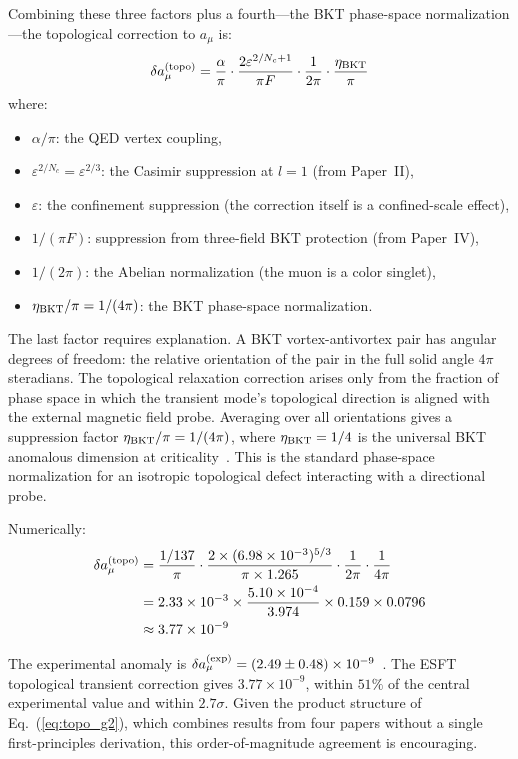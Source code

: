 ﻿\documentclass[twocolumn,preprintnumbers,amsmath,amssymb]{revtex4-2}
\begin{document}
Combining these three factors plus a fourth---the BKT phase-space normalization---the topological correction to $a_\mu$ is:
\begin{equation}
\delta a_\mu^{(\rm topo)} = \frac{\alpha}{\pi} \cdot \frac{2\varepsilon^{2/N_c + 1}}{\pi F} \cdot \frac{1}{2\pi} \cdot \frac{\eta_{\rm BKT}}{\pi}
\label{eq:topo_g2}
\end{equation}
where:
\begin{itemize}
\item $\alpha/\pi$: the QED vertex coupling,
\item $\varepsilon^{2/N_c} = \varepsilon^{2/3}$: the Casimir suppression at $l = 1$ (from Paper~II),
\item $\varepsilon$: the confinement suppression (the correction itself is a confined-scale effect),
\item $1/(\pi F)$: suppression from three-field BKT protection (from Paper~IV),
\item $1/(2\pi)$: the Abelian normalization (the muon is a color singlet),
\item $\eta_{\rm BKT}/\pi = 1/(4\pi)$: the BKT phase-space normalization.
\end{itemize}

The last factor requires explanation. A BKT vortex-antivortex pair has angular degrees of freedom: the relative orientation of the pair in the full solid angle $4\pi$ steradians. The topological relaxation correction arises only from the fraction of phase space in which the transient mode's topological direction is aligned with the external magnetic field probe. Averaging over all orientations gives a suppression factor $\eta_{\rm BKT}/\pi = 1/(4\pi)$, where $\eta_{\rm BKT} = 1/4$ is the universal BKT anomalous dimension at criticality~\cite{NK1977}. This is the standard phase-space normalization for an isotropic topological defect interacting with a directional probe.

Numerically:
\begin{align}
\delta a_\mu^{(\rm topo)} &= \frac{1/137}{\pi} \cdot \frac{2 \times (6.98 \times 10^{-3})^{5/3}}{\pi \times 1.265} \cdot \frac{1}{2\pi} \cdot \frac{1}{4\pi} \notag \\
&= 2.33 \times 10^{-3} \times \frac{5.10 \times 10^{-4}}{3.974} \times 0.159 \times 0.0796 \notag \\
&\approx 3.77 \times 10^{-9}
\label{eq:topo_g2_num}
\end{align}

The experimental anomaly is $\delta a_\mu^{(\rm exp)} = (2.49 \pm 0.48) \times 10^{-9}$~\cite{Muong2_2023}. The ESFT topological transient correction gives $3.77 \times 10^{-9}$, within $51\%$ of the central experimental value and within $2.7\sigma$. Given the product structure of Eq.~(\ref{eq:topo_g2}), which combines results from four papers without a single first-principles derivation, this order-of-magnitude agreement is encouraging.
\end{document}
